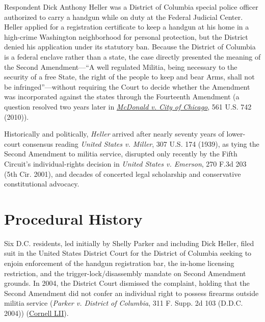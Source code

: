 \documentclass[12pt]{article}
\begin{document}
Respondent Dick Anthony Heller was a District of Columbia special police officer authorized to carry a handgun while on duty at the Federal Judicial Center. Heller applied for a registration certificate to keep a handgun at his home in a high-crime Washington neighborhood for personal protection, but the District denied his application under its statutory ban. Because the District of Columbia is a federal enclave rather than a state, the case directly presented the meaning of the Second Amendment---``A well regulated Militia, being necessary to the security of a free State, the right of the people to keep and bear Arms, shall not be infringed''---without requiring the Court to decide whether the Amendment was incorporated against the states through the Fourteenth Amendment (a question resolved two years later in \href{https://supreme.justia.com/cases/federal/us/561/742/}{\textit{McDonald v. City of Chicago}}, 561 U.S. 742 (2010)).

Historically and politically, \textit{Heller} arrived after nearly seventy years of lower-court consensus reading \textit{United States v. Miller}, 307 U.S. 174 (1939), as tying the Second Amendment to militia service, disrupted only recently by the Fifth Circuit's individual-rights decision in \textit{United States v. Emerson}, 270 F.3d 203 (5th Cir. 2001), and decades of concerted legal scholarship and conservative constitutional advocacy.

\section{Procedural History}
Six D.C. residents, led initially by Shelly Parker and including Dick Heller, filed suit in the United States District Court for the District of Columbia seeking to enjoin enforcement of the handgun registration bar, the in-home licensing restriction, and the trigger-lock/disassembly mandate on Second Amendment grounds. In 2004, the District Court dismissed the complaint, holding that the Second Amendment did not confer an individual right to possess firearms outside militia service (\textit{Parker v. District of Columbia}, 311 F. Supp. 2d 103 (D.D.C. 2004)) (\href{https://www.law.cornell.edu/supct/html/07-290.ZO.html}{Cornell LII}).
\end{document}
